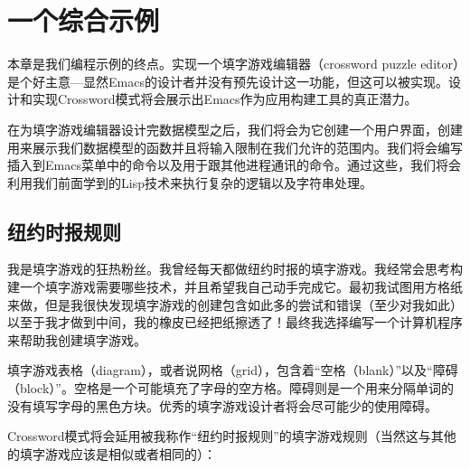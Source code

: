 \chapter{一个综合示例}
\label{chapter:10-A-Comprehensive-Example}


本章是我们编程示例的终点。实现一个填字游戏编辑器（crossword puzzle editor）是个好主意---显然Emacs的设计者并没有预先设计这一功能，但这可以被实现。设计和实现Crossword模式将会展示出Emacs作为应用构建工具的真正潜力。

在为填字游戏编辑器设计完数据模型之后，我们将会为它创建一个用户界面，创建用来展示我们数据模型的函数并且将输入限制在我们允许的范围内。我们将会编写插入到Emacs菜单中的命令以及用于跟其他进程通讯的命令。通过这些，我们将会利用我们前面学到的Lisp技术来执行复杂的逻辑以及字符串处理。

\section{纽约时报规则}
\label{section:10-New-York-Times-Rules}

我是填字游戏的狂热粉丝。我曾经每天都做纽约时报的填字游戏。我经常会思考构建一个填字游戏需要哪些技术，并且希望我自己动手完成它。最初我试图用方格纸来做，但是我很快发现填字游戏的创建包含如此多的尝试和错误（至少对我如此）以至于我才做到中间，我的橡皮已经把纸擦透了！最终我选择编写一个计算机程序来帮助我创建填字游戏。

填字游戏表格（diagram），或者说网格（grid），包含着“空格（blank）”以及“障碍（block）”。空格是一个可能填充了字母的空方格。障碍则是一个用来分隔单词的没有填写字母的黑色方块。优秀的填字游戏设计者将会尽可能少的使用障碍。

Crossword模式将会延用被我称作“纽约时报规则”的填字游戏规则（当然这与其他的填字游戏应该是相似或者相同的）：

